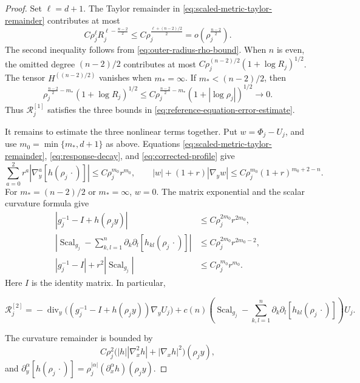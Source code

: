 \documentclass[11pt]{article}
\numberwithin{equation}{section}
\theoremstyle{remark}
\begin{document}
\begin{proof}
Set \(\ell=d+1\).
The Taylor remainder in \eqref{eq:scaled-metric-taylor-remainder}
contributes at most
\[
 C\rho_j^\ell R_j^{\ell-\frac{n-2}{2}}
 \le C\rho_j^{\frac{\ell+(n-2)/2}{2}}
 =o(\rho_j^{\frac{n-2}{2}}).
\]
The second inequality follows from
\eqref{eq:outer-radius-rho-bound}.
When \(n\) is even, the omitted degree \((n-2)/2\) contributes at most
\(C\rho_j^{(n-2)/2}(1+\log R_j)^{1/2}\).
The tensor \(H^{((n-2)/2)}\) vanishes when \(m_*=\infty\). If
\(m_*<(n-2)/2\), then
\[
 \rho_j^{\frac{n-2}{2}-m_*}(1+\log R_j)^{1/2}
 \le C\rho_j^{\frac{n-2}{2}-m_*}(1+|\log\rho_j|)^{1/2}
 \to0.
\]
Thus \(\mathcal R_j^{[1]}\) satisfies the three bounds in
\eqref{eq:reference-equation-error-estimate}.

It remains to estimate the three nonlinear terms together.
Put \(w=\Phi_j-U_j\), and use \(m_0=\min\{m_*,d+1\}\) as above.
Equations  \eqref{eq:scaled-metric-taylor-remainder},
\eqref{eq:response-decay}, and \eqref{eq:corrected-profile} give
\[
 \sum_{a=0}^2r^a
|\nabla_y^a[h(\rho_j\,\cdot)]|
 \le C\rho_j^{m_0} r^{m_0},\qquad
 |w|+(1+r)|\nabla_yw|
 \le C\rho_j^{m_0}(1+r)^{m_0+2-n}.
\]
For \(m_*=(n-2)/2\) or \(m_*=\infty\), \(w=0\).
The matrix exponential and the scalar curvature formula give
\[
 \begin{aligned}
 |g_j^{-1}-I+h(\rho_jy)|&\le C\rho_j^{2m_0}r^{2m_0},\\
 \left|\operatorname{Scal}_{g_j}-\sum_{k,l=1}^n
 \partial_k\partial_l[h_{kl}(\rho_j\,\cdot)]\right|
 &\le C\rho_j^{2m_0}r^{2m_0-2},\\
 |g_j^{-1}-I|+r^2|\operatorname{Scal}_{g_j}|&\le C\rho_j^{m_0} r^{m_0}.
 \end{aligned}
\]
Here \(I\) is the identity matrix. In particular,
 
\[
 \mathcal R_j^{[2]}
 ={}-\operatorname{div}_y\bigl((g_j^{-1}-I+h(\rho_jy))\nabla_yU_j\bigr)
 +c(n)\left(\operatorname{Scal}_{g_j}-\sum_{k,l=1}^n
 \partial_k\partial_l[h_{kl}(\rho_j\,\cdot)]\right)U_j.
\]

The curvature remainder is bounded by
\[
 C\rho_j^2\bigl(|h||\nabla_x^2h|+|\nabla_xh|^2\bigr)(\rho_jy),
\]
and \(\partial_y^\alpha[h(\rho_j\,\cdot)]
=\rho_j^{|\alpha|}(\partial_x^\alpha h)(\rho_jy)\).


\end{proof}
\end{document}
